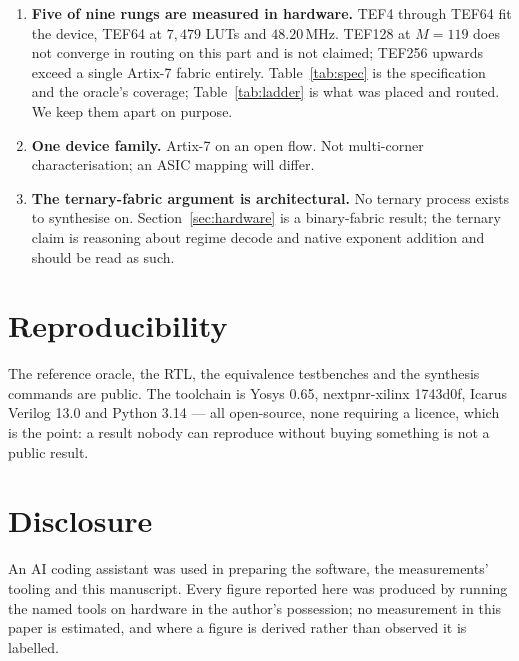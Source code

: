 \documentclass[11pt]{article}
\theoremstyle{definition}
\begin{document}
\begin{enumerate}[leftmargin=*]
\item \textbf{Five of nine rungs are measured in hardware.} TEF4 through TEF64 fit
the device, TEF64 at $7{,}479$ LUTs and $48.20$\,MHz. TEF128 at $M = 119$ does not
converge in routing on this part and is not claimed; TEF256 upwards exceed a
single Artix-7 fabric entirely. Table~\ref{tab:spec} is the
specification and the oracle's coverage; Table~\ref{tab:ladder} is what was
placed and routed. We keep them apart on purpose.

\item \textbf{One device family.} Artix-7 on an open flow. Not multi-corner
characterisation; an ASIC mapping will differ.

\item \textbf{The ternary-fabric argument is architectural.} No ternary process
exists to synthesise on. Section~\ref{sec:hardware} is a binary-fabric result;
the ternary claim is reasoning about regime decode and native exponent addition
and should be read as such.
\end{enumerate}

\section*{Reproducibility}

The reference oracle, the RTL, the equivalence testbenches and the synthesis
commands are public. The toolchain is Yosys 0.65, nextpnr-xilinx 1743d0f,
Icarus Verilog 13.0 and Python 3.14 --- all open-source, none requiring a
licence, which is the point: a result nobody can reproduce without buying
something is not a public result.

\section*{Disclosure}

An AI coding assistant was used in preparing the software, the measurements'
tooling and this manuscript. Every figure reported here was produced by running
the named tools on hardware in the author's possession; no measurement in this
paper is estimated, and where a figure is derived rather than observed it is
labelled.
\end{document}
